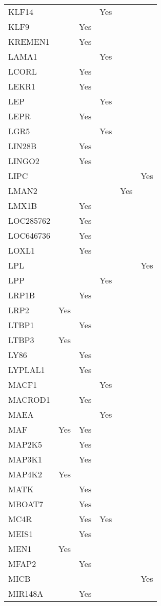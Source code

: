 \documentclass[]{report}
\begin{document}
\begin{appendices}
\begin{longtable}[t]{llllll}
KLF14 &  &  & Yes &  & \\
KLF9 &  & Yes &  &  & \\
KREMEN1 &  & Yes &  &  & \\
LAMA1 &  &  & Yes &  & \\
LCORL &  & Yes &  &  & \\
LEKR1 &  & Yes &  &  & \\
LEP &  &  & Yes &  & \\
LEPR &  & Yes &  &  & \\
LGR5 &  &  & Yes &  & \\
LIN28B &  & Yes &  &  & \\
LINGO2 &  & Yes &  &  & \\
LIPC &  &  &  &  & Yes\\
LMAN2 &  &  &  & Yes & \\
LMX1B &  & Yes &  &  & \\
LOC285762 &  & Yes &  &  & \\
LOC646736 &  & Yes &  &  & \\
LOXL1 &  & Yes &  &  & \\
LPL &  &  &  &  & Yes\\
LPP &  &  & Yes &  & \\
LRP1B &  & Yes &  &  & \\
LRP2 & Yes &  &  &  & \\
LTBP1 &  & Yes &  &  & \\
LTBP3 & Yes &  &  &  & \\
LY86 &  & Yes &  &  & \\
LYPLAL1 &  & Yes &  &  & \\
MACF1 &  &  & Yes &  & \\
MACROD1 &  & Yes &  &  & \\
MAEA &  &  & Yes &  & \\
MAF & Yes & Yes &  &  & \\
MAP2K5 &  & Yes &  &  & \\
MAP3K1 &  & Yes &  &  & \\
MAP4K2 & Yes &  &  &  & \\
MATK &  & Yes &  &  & \\
MBOAT7 &  & Yes &  &  & \\
MC4R &  & Yes & Yes &  & \\
MEIS1 &  & Yes &  &  & \\
MEN1 & Yes &  &  &  & \\
MFAP2 &  & Yes &  &  & \\
MICB &  &  &  &  & Yes\\
MIR148A &  & Yes &  &  & \\

\end{longtable}
\end{appendices}
\end{document}
